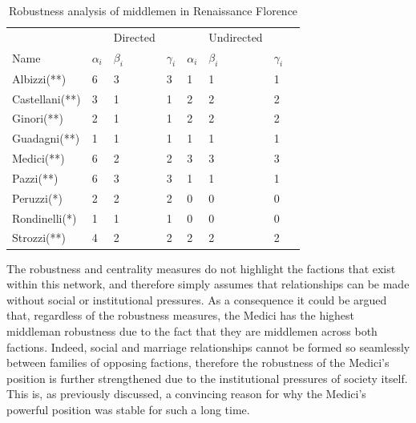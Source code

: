 \begin{table}[]
\centering
\caption{Robustness analysis of middlemen in Renaissance Florence}
\begin{tabu} to \textwidth {X[l]  X[c]  X[c]  X[c] || X[c]  X[c]  X[c]  X[c]} 
\hline \hline
               &              & Directed    &              &              & Undirected  &              \\
Name           & $\alpha_{i}$ & $\beta_{i}$ & $\gamma_{i}$ & $\alpha_{i}$ & $\beta_{i}$ & $\gamma_{i}$ \\ \hline
Albizzi(**)    & 6            & 3           & 3            & 1            & 1           & 1            \\
Castellani(**) & 3            & 1           & 1            & 2            & 2           & 2            \\
Ginori(**)     & 2            & 1           & 1            & 2            & 2           & 2            \\
Guadagni(**)   & 1            & 1           & 1            & 1            & 1           & 1            \\
Medici(**)     & 6            & 2           & 2            & 3            & 3           & 3            \\
Pazzi(**)      & 6            & 3           & 3            & 1            & 1           & 1            \\
Peruzzi(*)     & 2            & 2           & 2            & 0            & 0           & 0            \\
Rondinelli(*)  & 1            & 1           & 1            & 0            & 0           & 0            \\
Strozzi(**)    & 4            & 2           & 2            & 2            & 2           & 2            \\ \hline
\end{tabu}
\label{FlorenceRobust}
\end{table}

The robustness and centrality measures do not highlight the factions that exist within this network, and therefore simply assumes that relationships can be made without social or institutional pressures. As a consequence it could be argued that, regardless of the robustness measures, the Medici has the highest middleman robustness due to the fact that they are middlemen across both factions. Indeed, social and marriage relationships cannot be formed so seamlessly between families of opposing factions, therefore the robustness of the Medici's position is further strengthened due to the institutional pressures of society itself. This is, as previously discussed, a convincing reason for why the Medici's powerful position was stable for such a long time.

